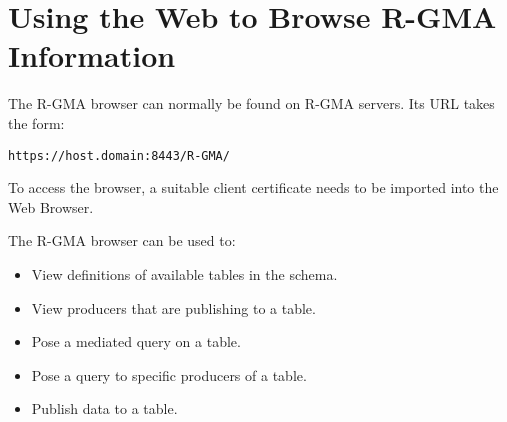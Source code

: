 \section{Using the Web to Browse R-GMA Information}

The R-GMA browser can normally be found on R-GMA servers. Its URL
takes the form:

\verb!https://host.domain:8443/R-GMA/!

To access the browser, a suitable client certificate needs to be
imported into the Web Browser.

The R-GMA browser can be used to:
\begin{itemize}
  \item View definitions of available tables in the schema.
  \item View producers that are publishing to a table.
  \item Pose a mediated query on a table.
  \item Pose a query to specific producers of a table.
  \item Publish data to a table.
\end{itemize}


